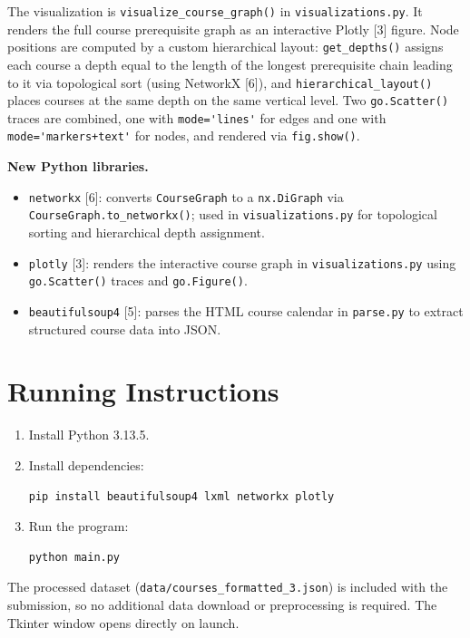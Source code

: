 \documentclass[11pt]{article}
\begin{document}
The visualization is \verb|visualize_course_graph()| in \verb|visualizations.py|. It renders
the full course prerequisite graph as an interactive Plotly [3] figure. Node positions are
computed by a custom hierarchical layout: \verb|get_depths()| assigns each course a depth
equal to the length of the longest prerequisite chain leading to it via topological sort
(using NetworkX [6]), and \verb|hierarchical_layout()| places courses at the same depth on
the same vertical level. Two \verb|go.Scatter()| traces are combined, one with
\verb|mode='lines'| for edges and one with \verb|mode='markers+text'| for nodes, and
rendered via \verb|fig.show()|.

\textbf{New Python libraries.}

\begin{itemize}
    \item \verb|networkx| [6]: converts \verb|CourseGraph| to a \verb|nx.DiGraph| via
    \verb|CourseGraph.to_networkx()|; used in \verb|visualizations.py| for topological
    sorting and hierarchical depth assignment.
    \item \verb|plotly| [3]: renders the interactive course graph in
    \verb|visualizations.py| using \verb|go.Scatter()| traces and \verb|go.Figure()|.
    \item \verb|beautifulsoup4| [5]: parses the HTML course calendar in \verb|parse.py|
    to extract structured course data into JSON.
\end{itemize}

\section*{Running Instructions}

\begin{enumerate}
    \item Install Python 3.13.5.
    \item Install dependencies:
\begin{verbatim}
pip install beautifulsoup4 lxml networkx plotly
\end{verbatim}
    \item Run the program:
\begin{verbatim}
python main.py
\end{verbatim}
\end{enumerate}

The processed dataset (\verb|data/courses_formatted_3.json|) is included with the submission,
so no additional data download or preprocessing is required. The Tkinter window opens directly
on launch.
\end{document}
